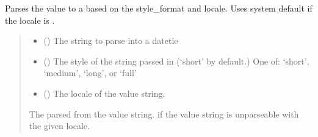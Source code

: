 \documentclass[letterpaper,10pt,english]{sphinxmanual}
\begin{document}
\begin{fulllineitems}
\label{\detokenize{apache_commons_validator_python.util:apache_commons_validator_python.util.datetime_helpers.ldml2strpdate}}
\pysigstartsignatures
{}
\pysigstopsignatures
\sphinxAtStartPar
Parses the value to a  based on the style\_format and locale. Uses
system default if the locale is .
\begin{quote}\begin{description}
\begin{itemize}
\item {} 
\sphinxAtStartPar
{} () \textendash{} The string to parse into a datetie

\item {} 
\sphinxAtStartPar
{} () \textendash{} The style of the  string passed in (‘short’ by default.)
One of: ‘short’, ‘medium’, ‘long’, or ‘full’

\item {} 
\sphinxAtStartPar
{} () \textendash{} The locale of the value string.

\end{itemize}

\sphinxAtStartPar
The parsed  from the value string.
 if the value string is unparseable with the given locale.

\end{description}\end{quote}

\end{fulllineitems}
\end{document}
